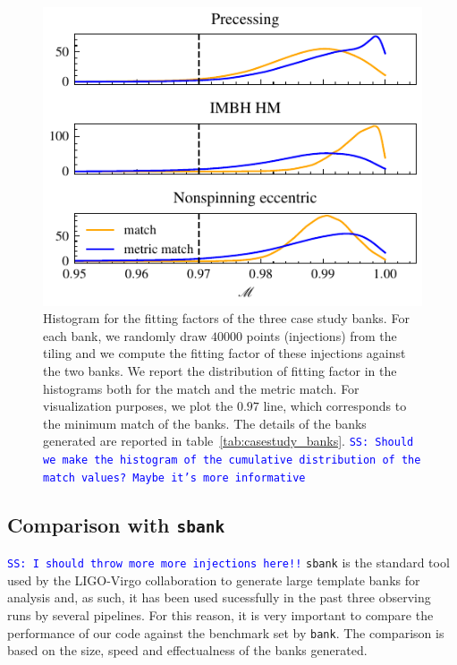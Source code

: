 \documentclass[twocolumn,showpacs,preprintnumbers,nofootinbib,prd,
superscriptaddress,10pt]{revtex4-2}
\newcommand{\stefano}[1]{{\textcolor{blue}{\texttt{SS: #1}} }}
\begin{document}
\begin{figure}[t!]
	\includegraphics{bank_injections}
	\caption{
	Histogram for the fitting factors of the three case study banks. For each bank, we randomly draw $40000$ points (injections) from the tiling and we compute the fitting factor of these injections against the two banks. We report the distribution of fitting factor in the histograms both for the match and the metric match. For visualization purposes, we plot the $0.97$ line, which corresponds to the minimum match of the banks.
	The details of the banks generated are reported in table~\ref{tab:casestudy_banks}.
	\stefano{Should we make the histogram of the cumulative distribution of the match values? Maybe it's more informative}
	}
	\label{fig:bank_injections}
\end{figure}

\subsection{Comparison with \texttt{sbank} }\label{sec:sbank_comparison}

\stefano{I should throw more more injections here!!}
\texttt{sbank} \cite{sbank} is the standard tool used by the LIGO-Virgo collaboration to generate large template banks for analysis and, as such, it has been used sucessfully in the past three observing runs by several pipelines.
For this reason, it is very important to compare the performance of our code against the benchmark set by \texttt{bank}. The comparison is based on the size, speed and effectualness of the banks generated.
\end{document}

